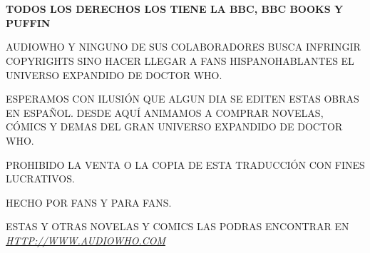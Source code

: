 \chapter*{}

\mbox{}

\vfill

\begin{center}

\textbf{TODOS LOS DERECHOS LOS TIENE LA BBC, BBC BOOKS Y PUFFIN}

\vspace{2mm}

AUDIOWHO Y NINGUNO DE SUS COLABORADORES BUSCA INFRINGIR COPYRIGHTS SINO HACER LLEGAR A FANS HISPANOHABLANTES EL UNIVERSO EXPANDIDO DE DOCTOR WHO.

\vspace{2mm}

ESPERAMOS CON ILUSIÓN QUE ALGUN DIA SE EDITEN ESTAS OBRAS EN ESPAÑOL. DESDE AQUÍ ANIMAMOS A COMPRAR NOVELAS, CÓMICS Y DEMAS DEL GRAN UNIVERSO EXPANDIDO DE DOCTOR WHO.

\vspace{2mm}

PROHIBIDO LA VENTA O LA COPIA DE ESTA TRADUCCIÓN CON FINES LUCRATIVOS.

\vspace{2mm}

HECHO POR FANS Y PARA FANS.

\vspace{2mm}

ESTAS Y OTRAS NOVELAS Y COMICS LAS PODRAS ENCONTRAR EN  \href{http://www.audiowho.com}{\textit{HTTP://WWW.AUDIOWHO.COM}}
\end{center}